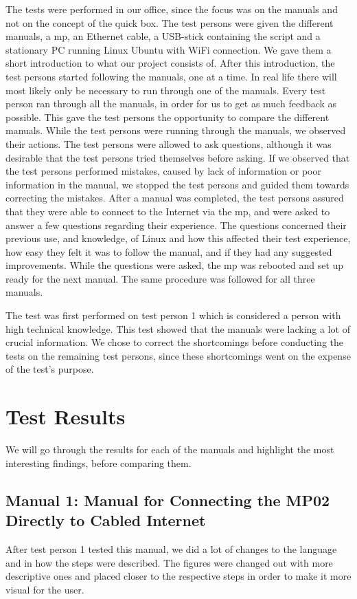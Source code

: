 The tests were performed in our office, since the focus was on the manuals and not on the concept of the \gls{quick} box. The test persons were given the different manuals, a \gls{mp}, an Ethernet cable, a USB-stick containing the script and a stationary PC running Linux Ubuntu with WiFi connection. We gave them a short introduction to what our project consists of. After this introduction, the test persons started following the manuals, one at a time. In real life there will most likely only be necessary to run through one of the manuals. Every test person ran through all the manuals, in order for us to get as much feedback as possible. This gave the test persons the opportunity to compare the different manuals. While the test persons were running through the manuals, we observed their actions. The test persons were allowed to ask questions, although it was desirable that the test persons tried themselves before asking. If we observed that the test persons performed mistakes, caused by lack of information or poor information in the manual, we stopped the test persons and guided them towards correcting the mistakes. After a manual was completed, the test persons assured that they were able to connect to the Internet via the \gls{mp}, and were asked to answer a few questions regarding their experience. The questions concerned their previous use, and knowledge, of Linux and how this affected their test experience, how easy they felt it was to follow the manual, and if they had any suggested improvements.
While the questions were asked, the \gls{mp} was rebooted and set up ready for the next manual. The same procedure was followed for all three  manuals. 

The test was first performed on test person 1 which is considered a person with high technical knowledge. This test showed that the manuals were lacking a lot of crucial information. We chose to correct the shortcomings before conducting the tests on the remaining test persons, since these shortcomings went on the expense of the test's purpose. 

\section{Test Results}
We will go through the results for each of the manuals and highlight the most interesting findings, before comparing them. 
 
\subsection{Manual 1: Manual for Connecting the MP02 Directly to Cabled Internet}
After test person 1 tested this manual, we did a lot of changes to the language and in how the steps were described. The figures were changed out with more descriptive ones and placed closer to the respective steps in order to make it more visual for the user. 

